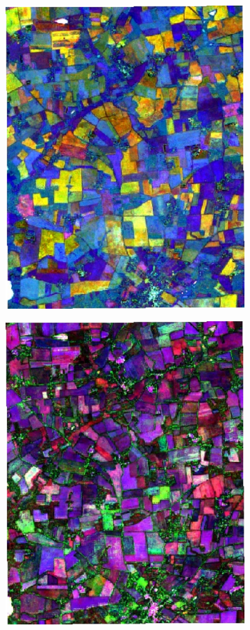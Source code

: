\documentclass[journal,article,submit,pdftex,moreauthors]{Definitions/mdpi}
\begin{document}
\begin{figure}[H]
\begin{subfigure}[t]{0.23\linewidth}
    \includegraphics[width=0.95\linewidth]{figures/aes_1_layer_mse_results/composites/composite_image_1.pdf}
	\caption{}
	\label{fig:color_map_b}
	\end{subfigure}
	\begin{subfigure}[t]{0.23\linewidth}
		\centering
	  \includegraphics[width=0.95\linewidth]{figures/aes_1_layer_mse_results/composites/composite_image_598481.pdf}

\end{subfigure}
\end{figure}
\end{document}
